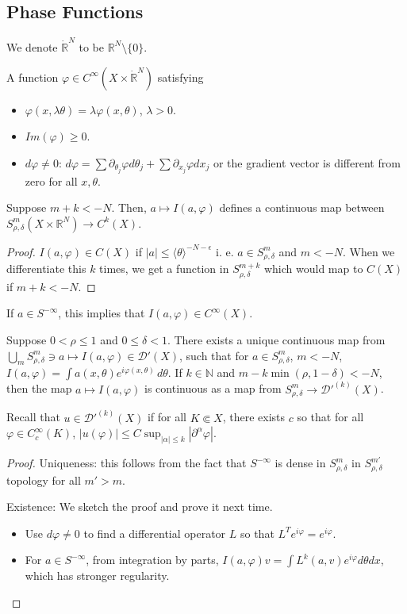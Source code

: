 \documentclass[12pt]{scrartcl}
\newcommand{\N}{\mathbb{N}}
\newcommand{\R}{\mathbb{R}}
\newcommand{\<}{\langle}
\renewcommand{\>}{\rangle}
\let \phi \varphi
\let \mc \mathcal
\begin{document}
\subsection{Phase Functions}
We denote $\dot{\R}^N$ to be $\R^N \setminus \{0\}$.  
\begin{definition} A function $\phi \in C^\infty(X \times \dot{\R}^{N})$ satisfying
\begin{itemize}
\item $\phi(x, \lambda \theta) = \lambda \phi(x, \theta)$, $\lambda > 0$.
\item $Im(\phi) \ge 0$.
\item $d\phi \ne 0$: $d \phi = \sum \partial_{\theta_j}\phi d\theta_j + \sum \partial_{x_j} \phi dx_j$ or the gradient vector is different from zero for all $x, \theta$.
\end{itemize}
\end{definition}
\begin{lemma} Suppose $m + k < -N$.  Then, $a \mapsto I(a, \phi)$ defines a continuous map between $S_{\rho, \delta}^m(X \times \R^N) \to C^k(X)$.
\end{lemma}
\begin{proof}
$I(a, \phi) \in C(X)$ if $|a| \le \<\theta\>^{-N - \epsilon}$ i. e. $a \in S^m_{\rho, \delta}$ and $m < -N$.  When we differentiate this $k$ times, we get a function in $S^{m+k}_{\rho, \delta}$ which would map to $C(X)$ if $m + k < -N$.
\end{proof}
\begin{corollary} If $a \in S^{-\infty}$, this implies that $I(a, \phi) \in C^\infty(X)$.  
\end{corollary}
\begin{theorem} Suppose $0 < \rho \le 1$ and $0 \le \delta < 1$.  There exists a unique continuous map from $\bigcup_m S^{m}_{\rho, \delta} \ni a \mapsto I(a, \phi) \in \mc D'(X)$, such that for $a \in S^{m}_{\rho, \delta}$, $m < -N$, $I(a, \phi) = \int a(x, \theta) e^{i \phi(x, \theta)}\, d\theta$.  If $k \in \N$ and $m - k \min(\rho, 1-\delta) < -N$, then the map $a \mapsto I(a, \phi)$ is continuous as a map from $S^m_{\rho, \delta} \to \mc D'^{(k)}(X)$.  
\end{theorem}
\begin{remark} Recall that $u \in \mc D'^{(k)}(X)$ if for all $K \Subset X$, there exists $c$ so that for all $\phi \in C_c^\infty(K)$, $|u(\phi)| \le C \sup_{|\alpha| \le k} |\partial^\alpha \phi|$.
\end{remark}
\begin{proof}
Uniqueness: this follows from the fact that $S^{-\infty}$ is dense in $S^m_{\rho, \delta}$ in $S^{m'}_{\rho, \delta}$ topology for all $m' > m$.  

Existence: We sketch the proof and prove it next time.
\begin{itemize}
\item Use $d\phi \ne 0$ to find a differential operator $L$ so that $L^T e^{i\phi} = e^{i\phi}$.  
\item For $a \in S^{-\infty}$, from integration by parts, $I(a, \phi)v = \int L^k(a, v) e^{i\phi} d\theta dx$, which has stronger regularity.
\end{itemize}
\end{proof}
\end{document}
